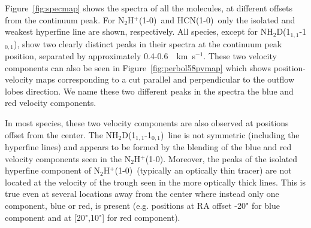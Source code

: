 \documentclass[iop]{emulateapj}
\newcommand{\kms}{\,~km~s$^{-1}$}
\newcommand{\nhtd}{\mbox{\rm NH$_2$D(1$_{1,1}$-1$_{0,1}$)}}
\newcommand{\nthp}{\mbox{\rm N$_2$H$^+$(1-0)}}
\newcommand{\hcn}{\mbox{\rm HCN(1-0)}}
\begin{document}
Figure~\ref{fig:specmap} shows the spectra of all the molecules, at different offsets from the continuum peak. For \nthp\ and \hcn\ only the isolated and weakest hyperfine line are shown, respectively. All species, except for \nhtd, show two clearly distinct peaks in their spectra at the continuum peak position, separated by approximately 0.4-0.6 \kms. These two velocity components can also be seen in Figure~\ref{fig:perbol58pvmap} which shows position-velocity maps corresponding to a cut parallel and perpendicular to the outflow lobes direction. We name these two different peaks in the spectra the blue and red velocity components.

In most species, these two velocity components are also observed at positions offset from the center. The \nhtd\ line is not symmetric (including the hyperfine lines) and appears to be formed by the blending of the blue and red velocity components seen in the \nthp. Moreover, the peaks of the isolated hyperfine component of \nthp\ (typically an optically thin tracer) are not located at the velocity of the trough seen in the more optically thick lines. This is true even at several locations away from the center where instead only one component, blue or red, is present (e.g. positions at RA offset -20" for blue component and at [20",10"] for red component).\\
\end{document}
